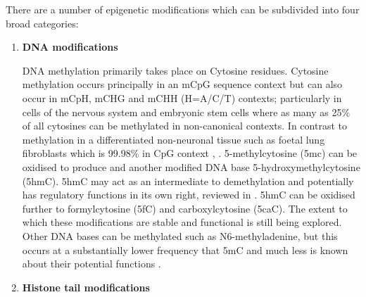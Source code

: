 \documentclass[]{book}
\begin{document}
There are a number of epigenetic modifications which can be subdivided into four broad categories:

\begin{enumerate}
\def\labelenumi{\arabic{enumi}.}
\item
  \textbf{DNA modifications}

  DNA methylation primarily takes place on Cytosine residues. Cytosine methylation occurs principally in an mCpG sequence context but can also occur in mCpH, mCHG and mCHH (H=A/C/T) contexts; particularly in cells of the nervous system \citep{Guo2014a} and embryonic stem cells where as many as 25\% of all cytosines can be methylated in non-canonical contexts. In contrast to methylation in a differentiated non-neuronal tissue such as foetal lung fibroblasts which is 99.98\% in CpG context \citep{Lister2009}, \citep{Schultz2015}. 5-methylcytosine (5mc) can be oxidised to produce and another modified DNA base 5-hydroxymethylcytosine (5hmC). 5hmC may act as an intermediate to demethylation and potentially has regulatory functions in its own right, reviewed in \citep{Pfeifer2013}. 5hmC can be oxidised further to formylcytosine (5fC) and carboxylcytosine (5caC). The extent to which these modifications are stable and functional is still being explored. Other DNA bases can be methylated such as N6-methyladenine, but this occurs at a substantially lower frequency that 5mC and much less is known about their potential functions \citep{Wu2016}.
\item
  \textbf{Histone tail modifications}


\end{enumerate}
\end{document}
